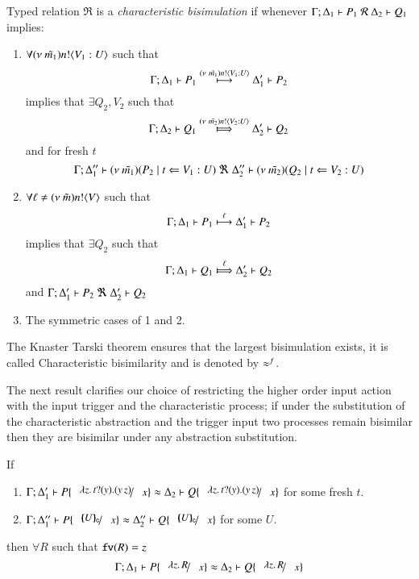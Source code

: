 \begin{definition}\rm
	\label{def:cbisim}
	Typed relation 
	$\Re$ is a {\em characteristic bisimulation} if whenever
	$\horel{\Gamma}{\Delta_1}{P_1}{\ \mathcal{R}\ }{\Delta_2}{Q_1}$ implies:
	\begin{enumerate}
		\item	$\forall (\nu\ \tilde{m_1}) n ! \langle V_1: U \rangle$ such that %
			\[
				\Gamma; \Delta_1 \vdash P_1 \stackrel{(\nu\ \tilde{m_1}) n ! \langle V_1: U \rangle}{\longmapsto} \Delta_1' \vdash P_2
			\]
			implies that $\exists Q_2, V_2$ such that %
			\[
				\horel{\Gamma}{\Delta_2}{Q_1}{\Hby{\news{\tilde{m_2}} \bactout{n}{V_2: U}}}{\Delta_2'}{Q_2}
			\]
			and for fresh $t$
			\[
				\Gamma; \Delta_1'' \vdash (\nu\ \tilde{m_1})(P_2 \;|\; t \Leftarrow V_1:U) \ \Re\  \Delta_2'' \vdash{(\nu\ \tilde{m_2})(Q_2 \;|\;t \Leftarrow V_2:U)}
			\]
%
		\item	$\forall \ell \not= (\nu\ \tilde{m}) n ! \langle V \rangle$ such that
			\[
				\Gamma; \Delta_1 \vdash P_1 \stackrel{\ell}{\longmapsto} \Delta_1' \vdash P_2
			\]
			implies that $\exists Q_2$ such that 
			\[
				\horel{\Gamma}{\Delta_1}{Q_1}{\Hby{\ell}}{\Delta_2'}{Q_2}
			\]
			and
			$\horel{\Gamma}{\Delta_1'}{P_2}{\ \Re\ }{\Delta_2'}{Q_2}$

		\item	The symmetric cases of 1 and 2.
	\end{enumerate}
	The Knaster Tarski theorem ensures that the largest bisimulation exists,
	it is called Characteristic bisimilarity and is denoted by $\approx^{f}$.
\end{definition}

The next result clarifies our choice of restricting
the higher order input action with the input trigger and
the characteristic process; if under the substitution
of the characteristic abstraction and the trigger
input two processes remain bisimilar then they
are bisimilar under any abstraction substitution.

\begin{lemma}\rm
	\label{lem:proc_subst}
	If 
%
	\begin{enumerate}
		\item	$\horel{\Gamma}{\Delta_1'}{P \subst{\abs{z}{\binp{t}{y} (\appl{y}{z})}}{x}}{\wb}{\Delta_2}{Q \subst{\abs{z}{\binp{t}{y} (\appl{y}{z})}}{x}}$
			for some fresh $t$.

		\item	$\horel{\Gamma}{\Delta_1''}{P \subst{\omapchar{U}}{x}}{\wb}{\Delta_2''}{Q \subst{\omapchar{U}}{x}}$
			for some $U$.
	\end{enumerate}
%
	then $\forall R$ such that $\mathtt{fv}(R) = z$
\[
	\horel{\Gamma}{\Delta_1}{P \subst{\abs{z}{R}}{x}}{\wb}{\Delta_2}{Q \subst{\abs{z}{R}}{x}}
\]
\end{lemma}

